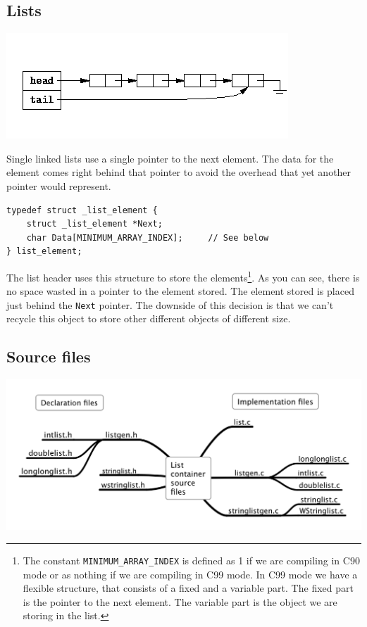 \documentclass[12pt,a4paper]{memoir} %
\begin{document}
{{\subsection{Lists}
\includegraphics[scale=0.63]{List.png}

Single linked lists use a single pointer to the next element. The data for the element comes right behind that pointer to avoid the overhead that yet 
another pointer would represent.
\begin{verbatim}
typedef struct _list_element {
    struct _list_element *Next;
    char Data[MINIMUM_ARRAY_INDEX];     // See below
} list_element;
\end{verbatim}
The list header uses this structure to store the elements\footnote{The constant \texttt{MINIMUM\_ARRAY\_INDEX} is defined as 1 if we are compiling in 
C90 mode or as nothing if we are compiling in C99 mode. In C99 mode we have a flexible structure, that consists of a fixed and a variable part. The 
fixed part is the pointer to the next element. The variable part is the object we are storing in the list. 
}. As you can see, there is no space wasted in a pointer to the element stored. The element stored is placed just behind the \texttt{Next} pointer. The 
downside of this decision is that we can't recycle this object to store other different objects of different size.
\subsection{Source files}
\begin{center}
\includegraphics[scale=0.41]{ListContainerSourceFiles.png}
\end{center}

}}
\end{document}
